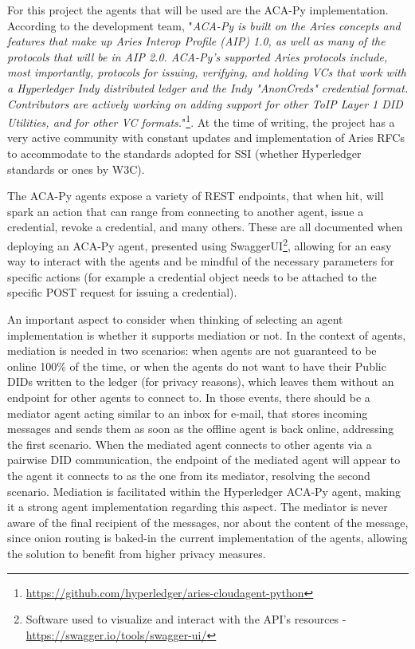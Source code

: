 For this project the agents that will be used are the \acrfull{ACA-Py} implementation. According to the development team, "\textit{ACA-Py is built on the Aries concepts and features that make up Aries Interop Profile (AIP) 1.0, as well as many of the protocols that will be in AIP 2.0. ACA-Py’s supported Aries protocols include, most importantly, protocols for issuing, verifying, and holding VCs that work with a Hyperledger Indy distributed ledger and the Indy "AnonCreds" credential format. Contributors are actively working on adding support for other ToIP Layer 1 DID Utilities, and for other VC formats.}"\footnote{\url{https://github.com/hyperledger/aries-cloudagent-python}}.
At the time of writing, the project has a very active community with constant updates and implementation of Aries \glspl{RFC} to accommodate to the standards adopted for SSI (whether Hyperledger standards or ones by W3C).

The ACA-Py agents expose a variety of \acrfull{REST} endpoints, that when hit, will spark an action that can range from connecting to another agent, issue a credential, revoke a credential, and many others. These are all documented when deploying an ACA-Py agent, presented using SwaggerUI\footnote{Software used to visualize and interact with the API’s resources - \url{https://swagger.io/tools/swagger-ui/}}, allowing for an easy way to interact with the agents and be mindful of the necessary parameters for specific actions (for example a credential object needs to be attached to the specific POST request for issuing a credential).

An important aspect to consider when thinking of selecting an agent implementation is whether it supports mediation or not. In the context of agents, mediation is needed in two scenarios: when agents are not guaranteed to be online 100\% of the time, or when the agents do not want to have their Public DIDs written to the ledger (for privacy reasons), which leaves them without an endpoint for other agents to connect to. In those events, there should be a mediator agent acting similar to an inbox for e-mail, that stores incoming messages and sends them as soon as the offline agent is back online, addressing the first scenario. 
When the mediated agent connects to other agents via a pairwise DID communication, the endpoint of the mediated agent will appear to the agent it connects to as the one from its mediator, resolving the second scenario.
Mediation is facilitated within the Hyperledger ACA-Py agent, making it a strong agent implementation regarding this aspect.
The mediator is never aware of the final recipient of the messages, nor about the content of the message, since onion routing is baked-in the current implementation of the agents, allowing the solution to benefit from higher privacy measures.

